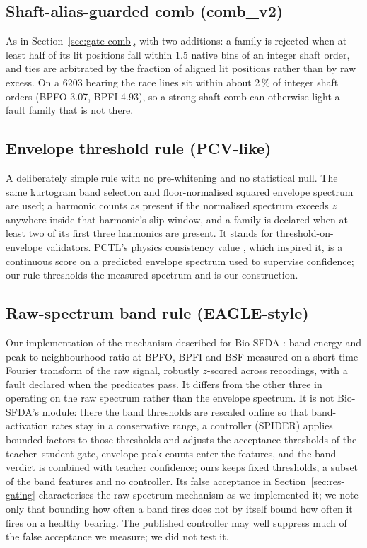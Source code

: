 \subsection{Shaft-alias-guarded comb (comb\_v2)}

As in Section~\ref{sec:gate-comb}, with two additions: a family is rejected when at least half of
its lit positions fall within 1.5 native bins of an integer shaft order, and ties are arbitrated by the fraction of aligned
lit positions rather than by raw excess. On a 6203 bearing the race lines sit within about 2\,\% of integer shaft orders
(BPFO 3.07, BPFI 4.93), so a strong shaft comb can otherwise light a fault family that is not there.

\subsection{Envelope threshold rule (PCV-like)}

A deliberately simple rule with no pre-whitening and no statistical null.
The same kurtogram band selection and floor-normalised squared envelope spectrum are used; a harmonic counts as present if
the normalised spectrum exceeds $z$ anywhere inside that harmonic's slip window, and a family is declared when at least two
of its first three harmonics are present. It stands for threshold-on-envelope validators. PCTL's physics consistency value
\cite{pctl2026}, which inspired it, is a continuous score on a predicted envelope spectrum used to supervise confidence; our
rule thresholds the measured spectrum and is our construction.

\subsection{Raw-spectrum band rule (EAGLE-style)}

Our implementation of the mechanism described for Bio-SFDA
\cite{yoon2026biosfda}: band energy and peak-to-neighbourhood ratio at BPFO, BPFI and BSF measured on a short-time Fourier
transform of the raw signal, robustly $z$-scored across recordings, with a fault declared when the predicates pass. It
differs from the other three in operating on the raw spectrum rather than the envelope spectrum. It is not Bio-SFDA's
module: there the band thresholds are rescaled online so that band-activation rates stay in a conservative range, a
controller (SPIDER) applies bounded factors to those thresholds and adjusts the acceptance thresholds of the
teacher--student gate, envelope peak counts enter the features, and the band verdict is combined with teacher confidence;
ours keeps fixed thresholds, a subset of the band features and no controller. Its false acceptance in Section~\ref{sec:res-gating} characterises the
raw-spectrum mechanism as we implemented it; we note only that bounding how often a band fires does not by itself bound how
often it fires on a healthy bearing. The published controller may well suppress much of the false acceptance we
measure; we did not test it.
